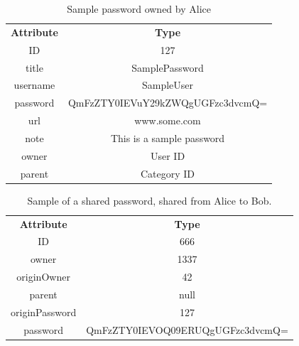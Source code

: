 			\begin{table}[p]
				\centering
				\begin{tabular}{c|c}
					\textbf{Attribute} 		& \textbf{Type} 											\\
					ID 						& 127 														\\
					title 					& SamplePassword 											\\
					username 				& SampleUser 												\\
					password 				& QmFzZTY0IEVuY29kZWQgUGFzc3dvcmQ= 							\\
					url						& www.some.com 												\\
					note  					& This is a sample password 								\\
					owner 					& User ID 													\\
					parent 					& Category ID 												\\
				\end{tabular}
				\caption{Sample password owned by Alice}
				\label{fig:example:sharedpassword:samplepassword}
			\end{table}

			\begin{table}[p]
				\centering
				\begin{tabular}{c|c}
					\textbf{Attribute} 		& \textbf{Type} 											\\
					ID 						& 666 														\\
					owner 					& 1337 														\\
					originOwner 			& 42 														\\
					parent 					& null 														\\
					originPassword			& 127 														\\
					password				& QmFzZTY0IEVOQ09ERUQgUGFzc3dvcmQ= 							\\
				\end{tabular}
				\caption{Sample of a shared password, shared from Alice to Bob.}
				\label{fig:example:sharedpassword:sampleshare}
			\end{table}

